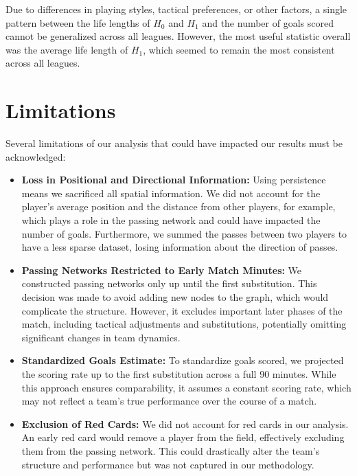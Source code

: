 \documentclass[10pt,twocolumn]{article}
\begin{document}
Due to differences in playing styles, tactical preferences, or other factors, a single pattern between the life lengths of $ H_0 $ and $ H_1 $ and the number of goals scored cannot be generalized across all leagues. However, the most useful statistic overall was the average life length of $ H_1 $, which seemed to remain the most consistent across all leagues.

\section*{Limitations}

Several limitations of our analysis that could have impacted our results must be acknowledged:

\begin{itemize}
    \item \textbf{Loss in Positional and Directional Information:} Using persistence means we sacrificed all spatial information. We did not account for the player's average position and the distance from other players, for example, which plays a role in the passing network and could have impacted the number of goals. Furthermore, we summed the passes between two players to have a less sparse dataset, losing information about the direction of passes.
    
    \item \textbf{Passing Networks Restricted to Early Match Minutes:} We constructed passing networks only up until the first substitution. This decision was made to avoid adding new nodes to the graph, which would complicate the structure. However, it excludes important later phases of the match, including tactical adjustments and substitutions, potentially omitting significant changes in team dynamics.
    
    \item \textbf{Standardized Goals Estimate:} To standardize goals scored, we projected the scoring rate up to the first substitution across a full 90 minutes. While this approach ensures comparability, it assumes a constant scoring rate, which may not reflect a team's true performance over the course of a match.
    
    \item \textbf{Exclusion of Red Cards:} We did not account for red cards in our analysis. An early red card would remove a player from the field, effectively excluding them from the passing network. This could drastically alter the team’s structure and performance but was not captured in our methodology.
    

\end{itemize}
\end{document}
